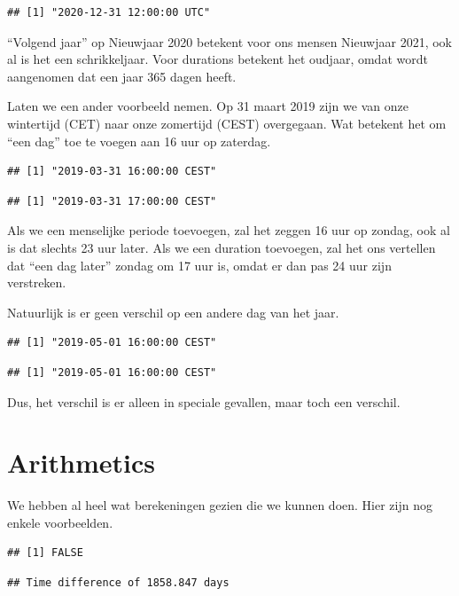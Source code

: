 \documentclass[]{tufte-book}
\begin{document}
\begin{verbatim}
## [1] "2020-12-31 12:00:00 UTC"
\end{verbatim}

``Volgend jaar'' op Nieuwjaar 2020 betekent voor ons mensen Nieuwjaar 2021, ook al is het een schrikkeljaar. Voor durations betekent het oudjaar, omdat wordt aangenomen dat een jaar 365 dagen heeft.

Laten we een ander voorbeeld nemen. Op 31 maart 2019 zijn we van onze wintertijd (CET) naar onze zomertijd (CEST) overgegaan. Wat betekent het om ``een dag'' toe te voegen aan 16 uur op zaterdag.

\begin{verbatim}
## [1] "2019-03-31 16:00:00 CEST"
\end{verbatim}

\begin{verbatim}
## [1] "2019-03-31 17:00:00 CEST"
\end{verbatim}

Als we een menselijke periode toevoegen, zal het zeggen 16 uur op zondag, ook al is dat slechts 23 uur later. Als we een duration toevoegen, zal het ons vertellen dat ``een dag later'' zondag om 17 uur is, omdat er dan pas 24 uur zijn verstreken.

Natuurlijk is er geen verschil op een andere dag van het jaar.

\begin{verbatim}
## [1] "2019-05-01 16:00:00 CEST"
\end{verbatim}

\begin{verbatim}
## [1] "2019-05-01 16:00:00 CEST"
\end{verbatim}

Dus, het verschil is er alleen in speciale gevallen, maar toch een verschil.

\hypertarget{arithmetics}{%
\section{Arithmetics}\label{arithmetics}}

We hebben al heel wat berekeningen gezien die we kunnen doen. Hier zijn nog enkele voorbeelden.

\begin{verbatim}
## [1] FALSE
\end{verbatim}

\begin{verbatim}
## Time difference of 1858.847 days
\end{verbatim}
\end{document}

